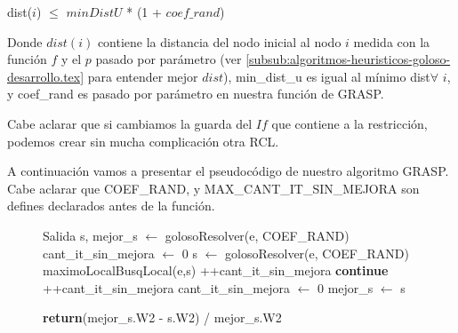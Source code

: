 \begin{center}
dist($i$) $\leq$ $minDistU$ * (1 + $coef\_rand$)
\end{center}

Donde $dist(i)$ contiene la distancia del nodo inicial al nodo $i$ medida con la función $f$ y el $p$ pasado por parámetro (ver \ref{subsub:algoritmos-heuristicos-goloso-desarrollo.tex} para entender mejor $dist$), min\_dist\_u es igual al mínimo dist$\forall$ $i$, y coef\_rand es pasado por parámetro en nuestra función de GRASP.

Cabe aclarar que si cambiamos la guarda del $If$ que contiene a la restricción, podemos crear sin mucha complicación otra RCL.

A continuación vamos a presentar el pseudocódigo de nuestro algoritmo GRASP. Cabe aclarar que COEF\_RAND, y MAX\_CANT\_IT\_SIN\_MEJORA son defines declarados antes de la función.

\begin{center}
 \begin{figure}[H]
  \begin{pseudo}
    \State Salida s, mejor\_s $\leftarrow$ golosoResolver(e, COEF\_RAND)
    \State cant\_it\_sin\_mejora $\leftarrow$ 0   
      \State s $\leftarrow$ golosoResolver(e, COEF\_RAND)
      \State maximoLocalBusqLocal(e,s)
	\State++cant\_it\_sin\_mejora
	\State \textbf{continue}
      \EndIf
	\State ++cant\_it\_sin\_mejora
      \Else
	\State cant\_it\_sin\_mejora $\leftarrow$ 0
      \EndIf
	\State mejor\_s $\leftarrow$ s
      \EndIf
    \EndWhile
    \EndProcedure
  \end{pseudo}
 \end{figure}
\end{center}

\begin{center}
 \begin{figure}[H]
  \begin{pseudo}
    \State \textbf{return}(mejor\_s.W2 - s.W2) / mejor\_s.W2
  \EndProcedure
  \end{pseudo}
 \end{figure}
\end{center}